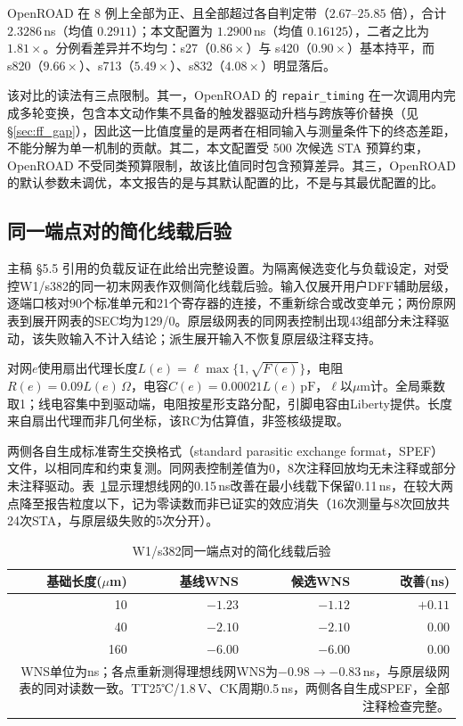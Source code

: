 \documentclass[twocolumn,10pt,fontset=windows]{ctexart}
\begin{document}
OpenROAD 在 8 例上全部为正、且全部超过各自判定带（$2.67$--$25.85$ 倍），合计 $2.3286$\,ns（均值 $0.2911$）；本文配置为 $1.2900$\,ns（均值 $0.16125$），二者之比为 $1.81\times$。分例看差异并不均匀：s27（$0.86\times$）与 s420（$0.90\times$）基本持平，而 s820（$9.66\times$）、s713（$5.49\times$）、s832（$4.08\times$）明显落后。

该对比的读法有三点限制。其一，OpenROAD 的 \texttt{repair\_timing} 在一次调用内完成多轮变换，包含本文动作集不具备的触发器驱动升档与跨族等价替换（见 \S\ref{sec:ff_gap}），因此这一比值度量的是两者在相同输入与测量条件下的终态差距，不能分解为单一机制的贡献。其二，本文配置受 500 次候选 STA 预算约束，OpenROAD 不受同类预算限制，故该比值同时包含预算差异。其三，OpenROAD 的默认参数未调优，本文报告的是与其默认配置的比，不是与其最优配置的比。

\subsection{同一端点对的简化线载后验}\label{sec:load_sup}

主稿 §5.5 引用的负载反证在此给出完整设置。为隔离候选变化与负载设定，对受控W1/s382的同一初末网表作双侧简化线载后验。输入仅展开用户DFF辅助层级，逐端口核对90个标准单元和21个寄存器的连接，不重新综合或改变单元；两份原网表到展开网表的SEC均为129/0。原层级网表的同网表控制出现43组部分未注释驱动，该失败输入不计入结论；派生展开输入不恢复原层级注释支持。

对网$e$使用扇出代理长度$L(e)=\ell\max\{1,\sqrt{F(e)}\}$，电阻$R(e)=0.09L(e)\,\Omega$，电容$C(e)=0.00021L(e)\,\mathrm{pF}$，$\ell$以$\mu$m计。全局乘数取1；线电容集中到驱动端，电阻按星形支路分配，引脚电容由Liberty提供。长度来自扇出代理而非几何坐标，该RC为估算值，非签核级提取。

两侧各自生成标准寄生交换格式（standard parasitic exchange format，SPEF）文件，以相同库和约束复测。同网表控制差值为0，8次注释回放均无未注释或部分未注释驱动。表~\ref{tab:load}显示理想线网的0.15\,ns改善在最小线载下保留0.11\,ns，在较大两点降至报告粒度以下，记为零读数而非已证实的效应消失（16次测量与8次回放共24次STA，与原层级失败的5次分开）。

\begin{table}[H]
\centering\caption{W1/s382同一端点对的简化线载后验}\label{tab:load}
\footnotesize\setlength{\tabcolsep}{3pt}
\begin{tabular}{rrrr}
\toprule 基础长度($\mu$m) & 基线WNS & 候选WNS & 改善(ns)\\\midrule
10 & $-1.23$ & $-1.12$ & $+0.11$\\
40 & $-2.10$ & $-2.10$ & $0.00$\\
160 & $-6.00$ & $-6.00$ & $0.00$\\
\bottomrule
\multicolumn{4}{p{0.94\columnwidth}}{\footnotesize WNS单位为ns；各点重新测得理想线网WNS为$-0.98\to-0.83$\,ns，与原层级网表的同对读数一致。TT25℃/1.8\,V、CK周期0.5\,ns，两侧各自生成SPEF，全部注释检查完整。}\\
\end{tabular}\end{table}
\end{document}
